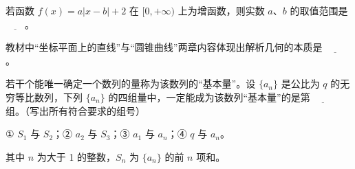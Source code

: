 \begin{question}
若函数 $f(x) = a|x - b| + 2$ 在 $[0, +\infty)$ 上为增函数，则实数 $a$、$b$ 的取值范围是 $\underline{\qquad}$。

\end{question}
\begin{question}
教材中“坐标平面上的直线”与“圆锥曲线”两章内容体现出解析几何的本质是 $\underline{\qquad}$。

\end{question}
\begin{question}
若干个能唯一确定一个数列的量称为该数列的“基本量”。设 $\{a_n\}$ 是公比为 $q$ 的无穷等比数列，下列 $\{a_n\}$ 的四组量中，一定能成为该数列“基本量”的是第 $\underline{\qquad}$ 组。（写出所有符合要求的组号）

① $S_1$ 与 $S_2$；② $a_2$ 与 $S_3$；③ $a_1$ 与 $a_n$；④ $q$ 与 $a_n$。

其中 $n$ 为大于 1 的整数，$S_n$ 为 $\{a_n\}$ 的前 $n$ 项和。

\end{question}

